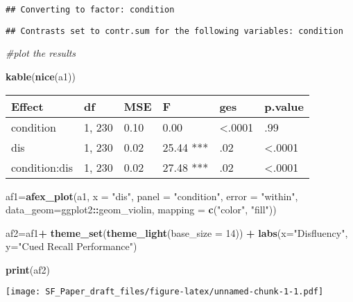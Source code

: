 \documentclass[]{article}
\newenvironment{Shaded}{\begin{snugshade}}{\end{snugshade}}
\newcommand{\CommentTok}[1]{\textcolor[rgb]{0.56,0.35,0.01}{\textit{#1}}}
\newcommand{\DataTypeTok}[1]{\textcolor[rgb]{0.13,0.29,0.53}{#1}}
\newcommand{\DecValTok}[1]{\textcolor[rgb]{0.00,0.00,0.81}{#1}}
\newcommand{\KeywordTok}[1]{\textcolor[rgb]{0.13,0.29,0.53}{\textbf{#1}}}
\newcommand{\NormalTok}[1]{#1}
\newcommand{\OperatorTok}[1]{\textcolor[rgb]{0.81,0.36,0.00}{\textbf{#1}}}
\newcommand{\StringTok}[1]{\textcolor[rgb]{0.31,0.60,0.02}{#1}}
\begin{document}
\begin{verbatim}
## Converting to factor: condition
\end{verbatim}

\begin{verbatim}
## Contrasts set to contr.sum for the following variables: condition
\end{verbatim}

\begin{Shaded}
\begin{Highlighting}[]
\CommentTok{#plot the results}

\KeywordTok{kable}\NormalTok{(}\KeywordTok{nice}\NormalTok{(a1))}
\end{Highlighting}
\end{Shaded}

\begin{longtable}[]{@{}llllll@{}}
\toprule
Effect & df & MSE & F & ges & p.value\tabularnewline
\midrule
\endhead
condition & 1, 230 & 0.10 & 0.00 & \textless{}.0001 & .99\tabularnewline
dis & 1, 230 & 0.02 & 25.44 *** & .02 & \textless{}.0001\tabularnewline
condition:dis & 1, 230 & 0.02 & 27.48 *** & .02 &
\textless{}.0001\tabularnewline
\bottomrule
\end{longtable}

\begin{Shaded}
\begin{Highlighting}[]
\NormalTok{af1=}\KeywordTok{afex_plot}\NormalTok{(a1, }\DataTypeTok{x =} \StringTok{"dis"}\NormalTok{, }\DataTypeTok{panel =} \StringTok{"condition"}\NormalTok{, }
              \DataTypeTok{error =} \StringTok{"within"}\NormalTok{,  }\DataTypeTok{data_geom=}\NormalTok{ggplot2}\OperatorTok{::}\NormalTok{geom_violin, }\DataTypeTok{mapping =} \KeywordTok{c}\NormalTok{(}\StringTok{"color"}\NormalTok{, }\StringTok{"fill"}\NormalTok{))}

\NormalTok{af2=af1}\OperatorTok{+}
\StringTok{  }\KeywordTok{theme_set}\NormalTok{(}\KeywordTok{theme_light}\NormalTok{(}\DataTypeTok{base_size =} \DecValTok{14}\NormalTok{)) }\OperatorTok{+}\StringTok{ }\KeywordTok{labs}\NormalTok{(}\DataTypeTok{x=}\StringTok{"Disfluency"}\NormalTok{, }\DataTypeTok{y=}\StringTok{"Cued Recall Performance"}\NormalTok{)}

\KeywordTok{print}\NormalTok{(af2)}
\end{Highlighting}
\end{Shaded}

\texttt{[image: SF\_Paper\_draft\_files/figure-latex/unnamed-chunk-1-1.pdf]}
\end{document}
